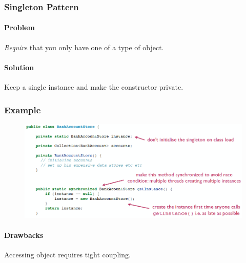 \documentclass[twocolumn,english]{article}
\begin{document}
\subsubsection{Singleton Pattern}

\paragraph{Problem}

\emph{Require} that you only have one of a type of object.

\paragraph{Solution}

Keep a single instance and make the constructor private.

\subsubsection*{Example}

\begin{figure}[H]
\centering{}\includegraphics[width=0.6\columnwidth]{img/singleton}
\end{figure}

\paragraph{Drawbacks}

Accessing object requires tight coupling.
\end{document}
